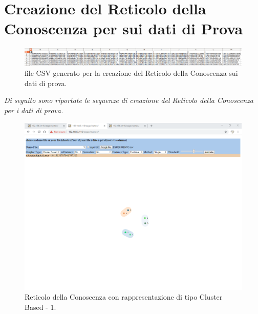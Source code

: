 \section{Creazione del Reticolo della Conoscenza per sui dati di Prova}
\label{Creazione del Reticolo della Conoscenza per sui dati di Prova}
\noindent
\begin{figure}[H]
\centering
	\includegraphics[width=1\linewidth]{./image/fileCSV_rete-prova.png}
	\caption{file CSV generato per la creazione del Reticolo della Conoscenza sui dati di prova.}
	\label{file CSV generato per la creazione del Reticolo della Conoscenza sui dati di prova.}
\end{figure}
\noindent
\textit{Di seguito sono riportate le sequenze di creazione del Reticolo della Conoscenza per i dati di prova.}
\noindent
\begin{figure}[H]
\centering
	\includegraphics[width=1\linewidth]{./image/reticoloCorretto1.png}
	\caption{Reticolo della Conoscenza con rappresentazione di tipo Cluster Based - 1.}
	\label{Reticolo della Conoscenza con rappresentazione di tipo Cluster Based - 1.}
\end{figure}
\noindent
